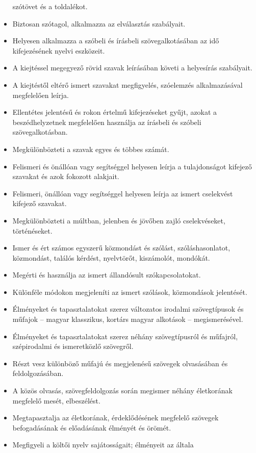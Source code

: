 \begin{itemize}
  szótövet és a toldalékot.
\item
  Biztosan szótagol, alkalmazza az elválasztás szabályait.
\item
  Helyesen alkalmazza a szóbeli és írásbeli szövegalkotásában az idő
  kifejezésének nyelvi eszközeit.
\item
  A kiejtéssel megegyező rövid szavak leírásában követi a helyesírás
  szabályait.
\item
  A kiejtéstől eltérő ismert szavakat megfigyelés, szóelemzés
  alkalmazásával megfelelően leírja.
\item
  Ellentétes jelentésű és rokon értelmű kifejezéseket gyűjt, azokat a
  beszédhelyzetnek megfelelően használja az írásbeli és szóbeli
  szövegalkotásban.
\item
  Megkülönbözteti a szavak egyes és többes számát.
\item
  Felismeri és önállóan vagy segítséggel helyesen leírja a tulajdonságot
  kifejező szavakat és azok fokozott alakjait.
\item
  Felismeri, önállóan vagy segítséggel helyesen leírja az ismert
  cselekvést kifejező szavakat.
\item
  Megkülönbözteti a múltban, jelenben és jövőben zajló cselekvéseket,
  történéseket.
\item
  Ismer és ért számos egyszerű közmondást és szólást, szóláshasonlatot,
  közmondást, találós kérdést, nyelvtörőt, kiszámolót, mondókát.
\item
  Megérti és használja az ismert állandósult szókapcsolatokat.
\item
  Különféle módokon megjeleníti az ismert szólások, közmondások
  jelentését.
\item
  Élményeket és tapasztalatokat szerez változatos irodalmi szövegtípusok
  és műfajok -- magyar klasszikus, kortárs magyar alkotások --
  megismerésével.
\item
  Élményeket és tapasztalatokat szerez néhány szövegtípusról és
  műfajról, szépirodalmi és ismeretközlő szövegről.
\item
  Részt vesz különböző műfajú és megjelenésű szövegek olvasásában és
  feldolgozásában.
\item
  A közös olvasás, szövegfeldolgozás során megismer néhány életkorának
  megfelelő mesét, elbeszélést.
\item
  Megtapasztalja az életkorának, érdeklődésének megfelelő szövegek
  befogadásának és előadásának élményét és örömét.
\item
  Megfigyeli a költői nyelv sajátosságait; élményeit az általa

\end{itemize}
